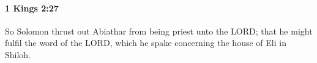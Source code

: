 
		\paragraph{1 Kings 2:27} %
			\label{1KINGS-2-27}

			So Solomon thrust out Abiathar from being priest unto the LORD; that he might fulfil the word of the LORD, which he spake concerning the house of Eli in Shiloh.


